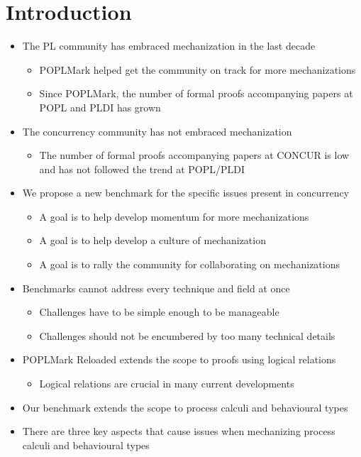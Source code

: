 \documentclass{article}
\begin{document}
\section{Introduction}
\begin{itemize}
\item The PL community has embraced mechanization in the last decade
  \begin{itemize}
  \item POPLMark helped get the community on track for more mechanizations
  \item Since POPLMark, the number of formal proofs accompanying papers at POPL and PLDI has grown
  \end{itemize}
\item The concurrency community has not embraced mechanization
  \begin{itemize}
  \item The number of formal proofs accompanying papers at CONCUR is low and has not followed the trend at POPL/PLDI
  \end{itemize}
\item We propose a new benchmark for the specific issues present in concurrency
  \begin{itemize}
  \item A goal is to help develop momentum for more mechanizations
  \item A goal is to help develop a culture of mechanization
  \item A goal is to rally the community for collaborating on mechanizations
  \end{itemize}
\item Benchmarks cannot address every technique and field at once
  \begin{itemize}
  \item Challenges have to be simple enough to be manageable
  \item Challenges should not be encumbered by too many technical details
  \end{itemize}
\item POPLMark Reloaded extends the scope to proofs using logical relations
  \begin{itemize}
  \item Logical relations are crucial in many current developments
  \end{itemize}
\item Our benchmark extends the scope to process calculi and behavioural types
\item There are three key aspects that cause issues when mechanizing process calculi and behavioural types

\end{itemize}
\end{document}
